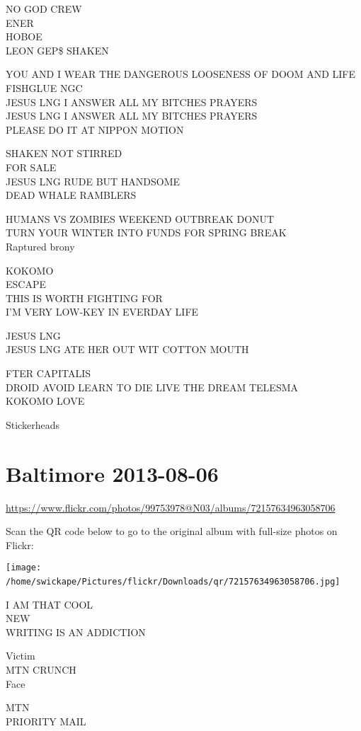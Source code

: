 \documentclass[10pt,letterpaper]{article}
\begin{document}
NO GOD CREW\\
ENER\\
HOBOE\\
LEON GEP\$ SHAKEN

YOU AND I WEAR THE DANGEROUS LOOSENESS OF DOOM AND LIFE FISHGLUE NGC\\
JESUS LNG I ANSWER ALL MY BITCHES PRAYERS\\
JESUS LNG I ANSWER ALL MY BITCHES PRAYERS\\
PLEASE DO IT AT NIPPON MOTION

SHAKEN NOT STIRRED\\
FOR SALE\\
JESUS LNG RUDE BUT HANDSOME\\
DEAD WHALE RAMBLERS

HUMANS VS ZOMBIES WEEKEND OUTBREAK DONUT\\
TURN YOUR WINTER INTO FUNDS FOR SPRING BREAK\\
Raptured brony

KOKOMO\\
ESCAPE\\
THIS IS WORTH FIGHTING FOR\\
I'M VERY LOW{-}KEY IN EVERDAY LIFE

JESUS LNG\\
JESUS LNG ATE HER OUT WIT COTTON MOUTH

FTER CAPITALIS\\
DROID AVOID LEARN TO DIE LIVE THE DREAM TELESMA\\
KOKOMO LOVE

Stickerheads
\

\section*{Baltimore 2013-08-06}

\url{https://www.flickr.com/photos/99753978@N03/albums/72157634963058706}

Scan the QR code below to go to the original album with full-size photos on Flickr:

\texttt{[image: /home/swickape/Pictures/flickr/Downloads/qr/72157634963058706.jpg]}
\

I AM THAT COOL\\
NEW\\
WRITING IS AN ADDICTION

Victim\\
MTN CRUNCH\\
Face

MTN\\
PRIORITY MAIL
\end{document}
